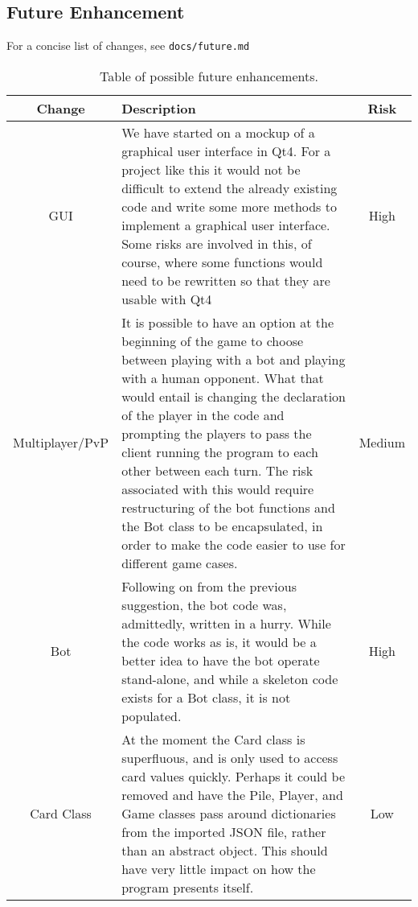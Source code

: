 \documentclass[12pt,a4paper,tightenlines]{article}
\begin{document}
\newpage
\subsection{Future Enhancement}
For a concise list of changes, see \texttt{docs/future.md}
\begin{table}[!ht]
    \begin{tabular}{|c|m{10cm}|c|}
        \hline
        Change & Description & Risk\\
        \hline
        GUI & We have started on a mockup of a graphical user interface
        in Qt4. For a project like this it would not be difficult
        to extend the already existing code and write some more
        methods to implement a graphical user interface. Some risks are 
        involved in this, of course, where some functions would need to be
        rewritten so that they are usable with Qt4 & 
        \cellcolor{red!50}High \\
        \hline
        Multiplayer/PvP & It is possible to have an option at the 
        beginning of the game to choose between playing with a bot
        and playing with a human opponent. What that would entail
        is changing the declaration of the player in the code and
        prompting the players to pass the client running the program
        to each other between each turn. The risk associated with this
        would require restructuring of the bot functions and the 
        Bot class to be encapsulated, in order to make the code easier
        to use for different game cases. & \cellcolor{yellow!50} Medium\\
        \hline
        Bot & Following on from the previous suggestion, the bot code was,
        admittedly, written in a hurry. While the code works as is, 
        it would be a better idea to have the bot operate 
        stand-alone, and while a skeleton code exists for a Bot
        class, it is not populated. & \cellcolor{red!50} High\\
        \hline
        Card Class & At the moment the Card class is superfluous, and
        is only used to access card values quickly. Perhaps it could
        be removed and have the Pile, Player, and Game classes pass around
        dictionaries from the imported JSON file, rather than an abstract 
        object. This should have very little impact on how the program
        presents itself.& \cellcolor{green!50} Low\\
        \hline
    \end{tabular}
    \caption{Table of possible future enhancements.}
\end{table}
\end{document}
